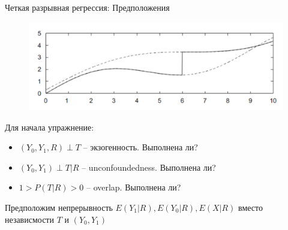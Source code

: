 \begin{frame}{Четкая разрывная регрессия: Предположения}
    \begin{figure}
        \centering
        \includegraphics[width=\textwidth]{Images/sharp.png}
    \end{figure}
    Для начала упражнение:
    \begin{itemize}[<+->]
    \item $(Y_0, Y_1, R) \perp T$ -- экзогенность. Выполнена ли? 
        \item $(Y_0, Y_1) \perp T | R$ -- unconfoundedness. Выполнена ли? 
        \item $1 > P(T | R) > 0$ -- overlap. Выполнена ли? 
    \end{itemize}
    \pause
    Предположим непрерывность $E(Y_1|R), E(Y_0|R), E(X|R)$ вместо независмости $T$ и $(Y_0, Y_1)$
\end{frame}


